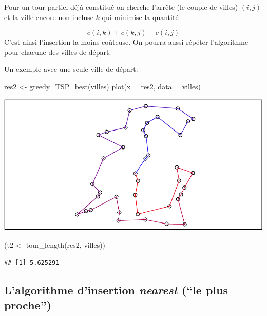 \documentclass[
]{article}
\newenvironment{Shaded}{\begin{snugshade}}{\end{snugshade}}
\newcommand{\AttributeTok}[1]{\textcolor[rgb]{0.77,0.63,0.00}{#1}}
\newcommand{\FunctionTok}[1]{\textcolor[rgb]{0.00,0.00,0.00}{#1}}
\newcommand{\NormalTok}[1]{#1}
\newcommand{\OtherTok}[1]{\textcolor[rgb]{0.56,0.35,0.01}{#1}}
\begin{document}
Pour un tour partiel déjà constitué on cherche l'arrête (le couple de
villes) \((i,j)\) et la ville encore non incluse \(k\) qui minimise la
quantité

\[c(i,k) + c(k,j) - c(i,j)\] C'est ainsi l'insertion la moins coûteuse.
On pourra aussi répéter l'algorithme pour chacune des villes de départ.

Un exemple avec une seule ville de départ:

\begin{Shaded}
\begin{Highlighting}[]
\NormalTok{res2 }\OtherTok{\textless{}{-}} \FunctionTok{greedy\_TSP\_best}\NormalTok{(villes)}
\FunctionTok{plot}\NormalTok{(}\AttributeTok{x =}\NormalTok{ res2, }\AttributeTok{data =}\NormalTok{ villes)}
\end{Highlighting}
\end{Shaded}

\includegraphics{rapport_TSP_files/figure-latex/insert cheapest-1.pdf}

\begin{Shaded}
\begin{Highlighting}[]
\NormalTok{(t2 }\OtherTok{\textless{}{-}} \FunctionTok{tour\_length}\NormalTok{(res2, villes))}
\end{Highlighting}
\end{Shaded}

\begin{verbatim}
## [1] 5.625291
\end{verbatim}

\hypertarget{lalgorithme-dinsertion-nearest-le-plus-proche}{%
\subsection{\texorpdfstring{L'algorithme d'insertion \emph{nearest}
(``le plus
proche'')}{L'algorithme d'insertion nearest (``le plus proche'')}}\label{lalgorithme-dinsertion-nearest-le-plus-proche}}
\end{document}
